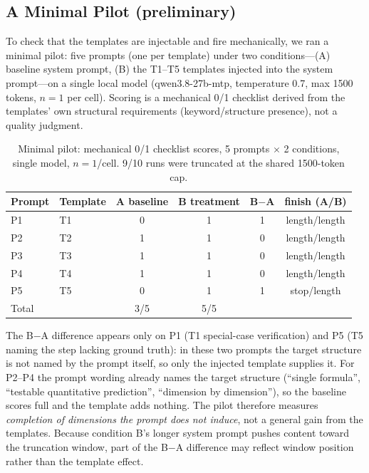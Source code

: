 \documentclass[11pt]{article}
\begin{document}
\subsection{A Minimal Pilot (preliminary)}
\label{sec:pilot}

To check that the templates are injectable and fire mechanically, we ran a
minimal pilot: five prompts (one per template) under two conditions---(A)
baseline system prompt, (B) the T1--T5 templates injected into the system
prompt---on a single local model (qwen3.8-27b-mtp, temperature 0.7, max 1500
tokens, $n{=}1$ per cell). Scoring
is a mechanical 0/1 checklist derived from the templates' own structural
requirements (keyword/structure presence), not a quality judgment.

\begin{table}[htbp]
\centering
\small
\begin{tabular}{llcccc}
\toprule
Prompt & Template & A baseline & B treatment & B$-$A & finish (A/B) \\
\midrule
P1 & T1 & 0 & 1 & 1 & length/length \\
P2 & T2 & 1 & 1 & 0 & length/length \\
P3 & T3 & 1 & 1 & 0 & length/length \\
P4 & T4 & 1 & 1 & 0 & length/length \\
P5 & T5 & 0 & 1 & 1 & stop/length \\
\midrule
Total & & 3/5 & 5/5 & & \\
\bottomrule
\end{tabular}
\caption{Minimal pilot: mechanical 0/1 checklist scores, 5 prompts $\times$ 2
conditions, single model, $n{=}1$/cell. 9/10 runs were truncated at the shared
1500-token cap.}
\label{tab:pilot}
\end{table}

The B$-$A difference appears only on P1 (T1 special-case verification) and P5
(T5 naming the step lacking ground truth): in these two prompts the target
structure is not named by the prompt itself, so only the injected template
supplies it. For P2--P4 the prompt wording already names the target structure
(``single formula'', ``testable quantitative prediction'', ``dimension by
dimension''), so the baseline scores full and the template adds nothing. The
pilot therefore measures \emph{completion of dimensions the prompt does not
induce}, not a general gain from the templates. Because condition B's longer
system prompt pushes content toward the truncation window, part of the B$-$A
difference may reflect window position rather than the template effect.
\end{document}
